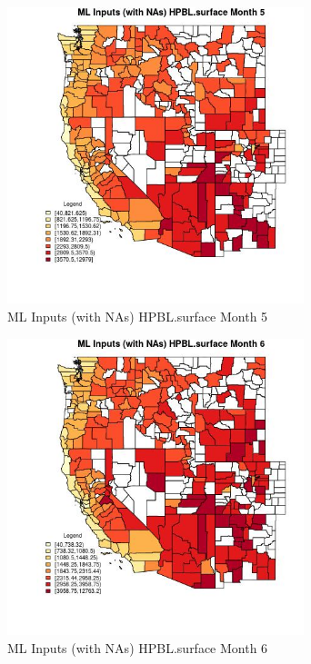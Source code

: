 \clearpage 

\begin{figure} 
\centering  
\includegraphics[width=0.77\textwidth]{Code_Outputs/Report_ML_input_PM25_Step4_part_e_de_duplicated_aves_compiled_2019-05-21wNAs_CountyHPBLsurfacemedianMonth5.jpg} 
\caption{\label{fig:Report_ML_input_PM25_Step4_part_e_de_duplicated_aves_compiled_2019-05-21wNAsCountyHPBLsurfacemedianMonth5}ML Inputs (with NAs) HPBL.surface Month 5} 
\end{figure} 
 

\begin{figure} 
\centering  
\includegraphics[width=0.77\textwidth]{Code_Outputs/Report_ML_input_PM25_Step4_part_e_de_duplicated_aves_compiled_2019-05-21wNAs_CountyHPBLsurfacemedianMonth6.jpg} 
\caption{\label{fig:Report_ML_input_PM25_Step4_part_e_de_duplicated_aves_compiled_2019-05-21wNAsCountyHPBLsurfacemedianMonth6}ML Inputs (with NAs) HPBL.surface Month 6} 
\end{figure} 
 

